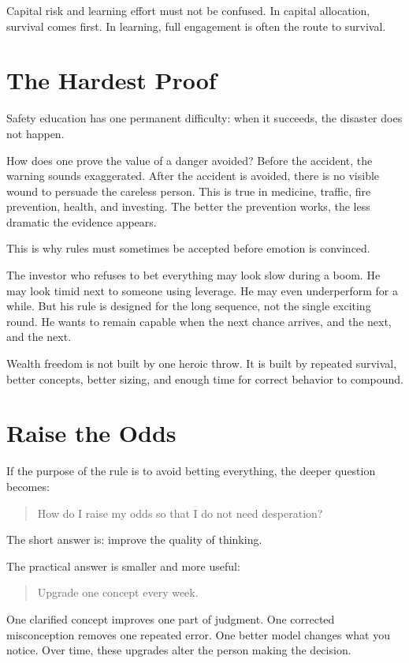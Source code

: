 Capital risk and learning effort must not be confused. In capital allocation, survival comes first. In learning, full engagement is often the route to survival.

\section*{The Hardest Proof}

Safety education has one permanent difficulty: when it succeeds, the disaster does not happen.

How does one prove the value of a danger avoided? Before the accident, the warning sounds exaggerated. After the accident is avoided, there is no visible wound to persuade the careless person. This is true in medicine, traffic, fire prevention, health, and investing. The better the prevention works, the less dramatic the evidence appears.

This is why rules must sometimes be accepted before emotion is convinced.

The investor who refuses to bet everything may look slow during a boom. He may look timid next to someone using leverage. He may even underperform for a while. But his rule is designed for the long sequence, not the single exciting round. He wants to remain capable when the next chance arrives, and the next, and the next.

Wealth freedom is not built by one heroic throw. It is built by repeated survival, better concepts, better sizing, and enough time for correct behavior to compound.

\section*{Raise the Odds}

If the purpose of the rule is to avoid betting everything, the deeper question becomes:

\begin{quote}
How do I raise my odds so that I do not need desperation?
\end{quote}

The short answer is: improve the quality of thinking.

The practical answer is smaller and more useful:

\begin{quote}
Upgrade one concept every week.
\end{quote}

One clarified concept improves one part of judgment. One corrected misconception removes one repeated error. One better model changes what you notice. Over time, these upgrades alter the person making the decision.

